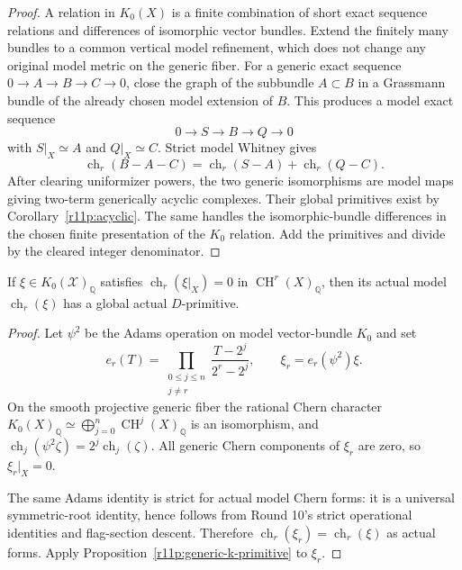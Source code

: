 \begin{proof}
A relation in $K_0(X)$ is a finite combination of short exact sequence
relations and differences of isomorphic vector bundles.  Extend the
finitely many bundles to a common vertical model refinement, which
does not change any original model metric on the generic fiber.
For a generic exact sequence $0\to A\to B\to C\to0$, close the graph
of the subbundle $A\subset B$ in a Grassmann bundle of the already
chosen model extension of $B$.  This produces a model exact sequence
\[
                         0\to S\to B\to Q\to0
\]
with $S|_X\simeq A$ and $Q|_X\simeq C$.  Strict model Whitney gives
\[
      \operatorname{ch}_r(B-A-C)
       =\operatorname{ch}_r(S-A)+\operatorname{ch}_r(Q-C).
\]
After clearing uniformizer powers, the two generic isomorphisms are
model maps giving two-term generically acyclic complexes.  Their
global primitives exist by Corollary~\ref{r11p:acyclic}.
The same handles the isomorphic-bundle differences in the chosen
finite presentation of the $K_0$ relation.  Add the primitives and
divide by the cleared integer denominator.
\end{proof}

\begin{proposition}
\label{r11p:generic-chow-primitive}
If $\xi\in K_0(\mathcal X)_{\mathbb Q}$ satisfies
$\operatorname{ch}_r(\xi|_X)=0$ in
$\operatorname{CH}^r(X)_{\mathbb Q}$, then its actual model
$\operatorname{ch}_r(\xi)$ has a global actual $D$-primitive.
\end{proposition}

\begin{proof}
Let $\psi^2$ be the Adams operation on model vector-bundle $K_0$ and set
\[
 e_r(T)=\prod_{\substack{0\leq j\leq n\\j\ne r}}
                  \frac{T-2^j}{2^r-2^j},
 \qquad
                            \xi_r=e_r(\psi^2)\xi.
\]
On the smooth projective generic fiber the rational Chern character
$K_0(X)_{\mathbb Q}\simeq\bigoplus_{j=0}^n
\operatorname{CH}^j(X)_{\mathbb Q}$ is an isomorphism, and
$\operatorname{ch}_j(\psi^2\zeta)=2^j\operatorname{ch}_j(\zeta)$.
All generic Chern components of $\xi_r$ are zero, so $\xi_r|_X=0$.

The same Adams identity is strict for actual model Chern forms:
it is a universal symmetric-root identity, hence follows from
Round 10's strict operational identities and flag-section descent.
Therefore $\operatorname{ch}_r(\xi_r)=\operatorname{ch}_r(\xi)$
as actual forms.  Apply Proposition~\ref{r11p:generic-k-primitive}
to $\xi_r$.
\end{proof}

